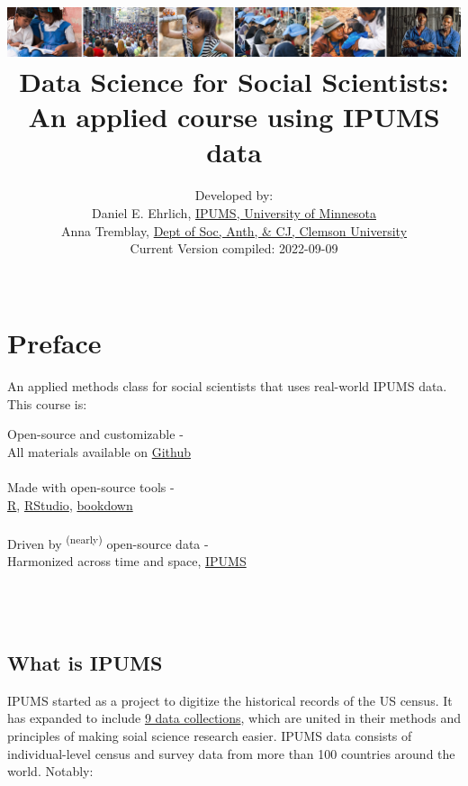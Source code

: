 \documentclass[
]{book}
\title{\includegraphics{ipums_banner.png}\\
Data Science for Social Scientists:\\
An applied course using IPUMS data}
\author{Developed by:\\
\hspace*{0.333em}\hspace*{0.333em}Daniel E. Ehrlich, \href{https://international.ipums.org/international/}{IPUMS, University of Minnesota}\\
\hspace*{0.333em}\hspace*{0.333em}Anna Tremblay, \href{https://www.clemson.edu/cbshs/departments/sacj/degrees/anthropology.html}{Dept of Soc, Anth, \& CJ, Clemson University}\\
\hspace*{0.333em}\hspace*{0.333em}Current Version compiled: 2022-09-09\\
~\\}
\date{}
\begin{document}
\maketitle

{
\setcounter{tocdepth}{1}
\tableofcontents
}
\hypertarget{preface}{%
\chapter*{Preface}\label{preface}}

An applied methods class for social scientists that uses real-world IPUMS data. This course is:

Open-source and customizable -\\
\hspace*{0.333em}\hspace*{0.333em}\hspace*{0.333em}All materials available on \href{https://github.com/ehrlichd/stats_book}{Github}\\
~\\
Made with open-source tools -\\
\hspace*{0.333em}\hspace*{0.333em}\href{https://cran.r-project.org/}{R}, \href{https://www.rstudio.com/products/rstudio/}{RStudio}, \href{https://bookdown.org/}{bookdown}\\
~\\
Driven by \textsuperscript{(nearly)} open-source data -\\
\hspace*{0.333em}\hspace*{0.333em}Harmonized across time and space, \href{https://ipums.org}{IPUMS}\\
~\\
~\\

~\\

\hypertarget{what-is-ipums}{%
\section*{What is IPUMS}\label{what-is-ipums}}

IPUMS started as a project to digitize the historical records of the US census. It has expanded to include \href{https://www.ipums.org/}{9 data collections}, which are united in their methods and principles of making soial science research easier. IPUMS data consists of individual-level census and survey data from more than 100 countries around the world. Notably:
\end{document}
